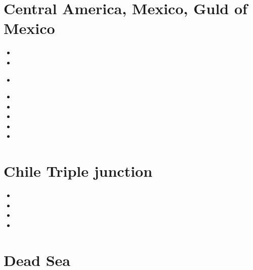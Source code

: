 \section{Central America, Mexico, Guld of Mexico}

\begin{small}
\begin{itemize}
\item[\twothousand] 
\item[\twothousandeight] 
\item[\twothousandnine] 
\\
\item[\twothousandtwelve] 
\item[\twothousandfifteen] 
\item[\twothousandsixteen] 
\item[\twothousandseventeen] 
\item[\twothousandtwentythree] 
\end{itemize}
\end{small}

\section{Chile Triple junction}

\begin{small}
\begin{itemize}
\item[2008] 
\item[2012] 
\item[2021] 
\item[2023] 
\end{itemize}
\end{small}


\section{Dead Sea} 


